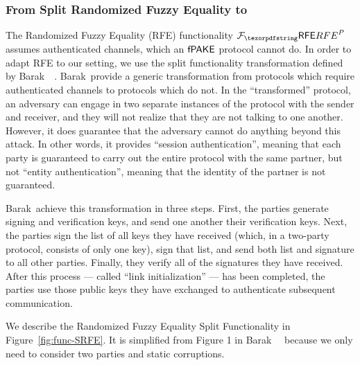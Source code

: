 
\subsubsection{From Split Randomized Fuzzy Equality to \FAKE}
\label{sec:ygcfaketransformation}

The Randomized Fuzzy Equality (RFE) functionality $\Frfe^{P}$ assumes authenticated channels, which an $\textsf{fPAKE}$ protocol cannot do.
In order to adapt RFE to our setting, we use the split functionality transformation defined by Barak~\etal~\cite{C:BCLPR05}.
Barak~\etal provide a generic transformation from protocols which require authenticated channels to protocols which do not.
In the ``transformed'' protocol, an adversary can engage in two separate instances of the protocol with the sender and receiver, and they will not realize that they are not talking to one another.
However, it does guarantee that the adversary cannot do anything beyond this attack.
In other words, it provides ``session authentication'', meaning that each party is guaranteed to carry out the entire protocol with the same partner, but not ``entity authentication'', meaning that the identity of the partner is not guaranteed.

Barak~\etal achieve this transformation in three steps.
First, the parties generate signing and verification keys, and send one another their verification keys.
Next, the parties sign the list of all keys they have received (which, in a two-party protocol, consists of only one key), sign that list, and send both list and signature to all other parties.
Finally, they verify all of the signatures they have received.
After this process --- called ``link initialization'' --- has been completed, the parties use those public keys they have exchanged to authenticate subsequent communication. 

We describe the Randomized Fuzzy Equality Split Functionality in Figure~\ref{fig:func-SRFE}.
It is simplified from Figure 1 in Barak~\etal~\cite{C:BCLPR05} because we only need to consider two parties and static corruptions.

